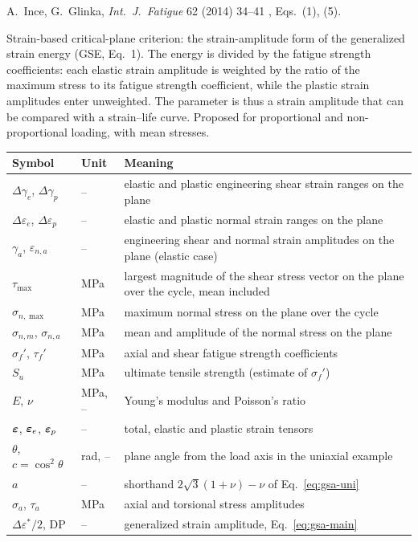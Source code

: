 \label{sheet:GSA}

 A.~Ince, G.~Glinka, \emph{Int.\ J.\ Fatigue} 62 (2014) 34--41 \cite{ince2014},
Eqs.~(1), (5).

 Strain-based critical-plane criterion: the strain-amplitude form of the
generalized strain energy (GSE, Eq.~1). The energy is divided by the fatigue strength coefficients:
each elastic strain amplitude is weighted by the ratio of the maximum stress to its fatigue
strength coefficient, while the plastic strain amplitudes enter unweighted. The parameter is thus
a strain amplitude that can be compared with a strain--life curve. Proposed for proportional and
non-proportional loading, with mean stresses.

\begin{center}\small
\begin{tabular}{@{}llp{100mm}@{}}
\toprule
Symbol & Unit & Meaning\\\midrule
$\Delta\gamma_e$, $\Delta\gamma_p$ & -- & elastic and plastic engineering shear strain ranges on the plane\\
$\Delta\varepsilon_e$, $\Delta\varepsilon_p$ & -- & elastic and plastic normal strain ranges on the plane\\
$\gamma_a$, $\varepsilon_{n,a}$ & -- & engineering shear and normal strain amplitudes on the plane (elastic case)\\
$\tau_{\max}$ & MPa & largest magnitude of the shear stress vector on the plane over the cycle, mean included\\
$\sigma_{n,\max}$ & MPa & maximum normal stress on the plane over the cycle\\
$\sigma_{n,m}$, $\sigma_{n,a}$ & MPa & mean and amplitude of the normal stress on the plane\\
$\sigma_f'$, $\tau_f'$ & MPa & axial and shear fatigue strength coefficients\\
$S_u$ & MPa & ultimate tensile strength (estimate of $\sigma_f'$)\\
$E$, $\nu$ & MPa, -- & Young's modulus and Poisson's ratio\\
$\boldsymbol\varepsilon$, $\boldsymbol\varepsilon_e$, $\boldsymbol\varepsilon_p$ & -- & total, elastic and plastic strain tensors\\
$\theta$, $c=\cos^2\theta$ & rad, -- & plane angle from the load axis in the uniaxial example\\
$a$ & -- & shorthand $2\sqrt3(1+\nu)-\nu$ of Eq.~\eqref{eq:gsa-uni}\\
$\sigma_a$, $\tau_a$ & MPa & axial and torsional stress amplitudes\\
$\Delta\varepsilon^*/2$, $\mathrm{DP}$ & -- & generalized strain amplitude, Eq.~\eqref{eq:gsa-main}\\
\bottomrule
\end{tabular}
\end{center}

